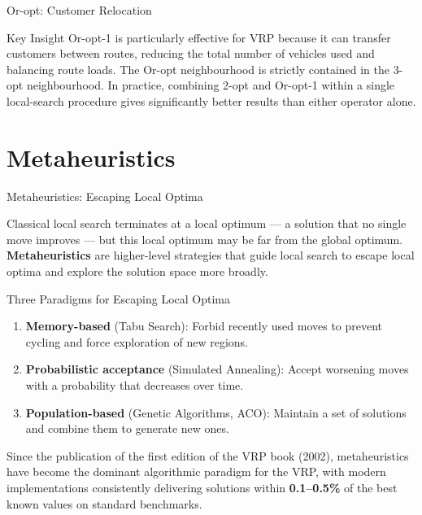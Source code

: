 \documentclass[aspectratio=169,10pt]{beamer}
\begin{document}
\begin{frame}[allowframebreaks]{Or-opt: Customer Relocation}
  \begin{alertblock}{Key Insight}
    Or-opt-1 is particularly effective for VRP because it can transfer
    customers between routes, reducing the total number of vehicles used
    and balancing route loads.  The Or-opt neighbourhood is strictly
    contained in the 3-opt neighbourhood.  In practice, combining 2-opt
    and Or-opt-1 within a single local-search procedure gives
    significantly better results than either operator alone.
  \end{alertblock}

\end{frame}

\section{Metaheuristics}

\begin{frame}[allowframebreaks]{Metaheuristics: Escaping Local Optima}

  Classical local search terminates at a local optimum — a solution that
  no single move improves — but this local optimum may be far from the
  global optimum.  \textbf{Metaheuristics} are higher-level strategies that
  guide local search to escape local optima and explore the solution space
  more broadly.

  \begin{block}{Three Paradigms for Escaping Local Optima}
    \begin{enumerate}
      \item \textbf{Memory-based} (Tabu Search): Forbid recently used moves
            to prevent cycling and force exploration of new regions.
      \item \textbf{Probabilistic acceptance} (Simulated Annealing): Accept
            worsening moves with a probability that decreases over time.
      \item \textbf{Population-based} (Genetic Algorithms, ACO): Maintain
            a set of solutions and combine them to generate new ones.
    \end{enumerate}
  \end{block}

  Since the publication of the first edition of the VRP book (2002),
  metaheuristics have become the dominant algorithmic paradigm for
  the VRP, with modern implementations consistently delivering solutions
  within \textbf{0.1--0.5\%} of the best known values on standard
  benchmarks.

\end{frame}
\end{document}

